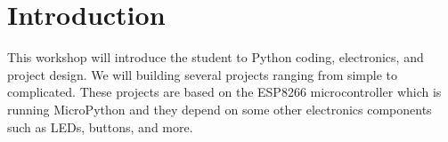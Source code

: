 \chapter{Introduction}
This workshop will introduce the student to Python coding, electronics, and project
design. We will building several projects ranging from simple to complicated. These
projects are based on the ESP8266 microcontroller which is running MicroPython and
they depend on some other electronics components such as LEDs, buttons, and more.